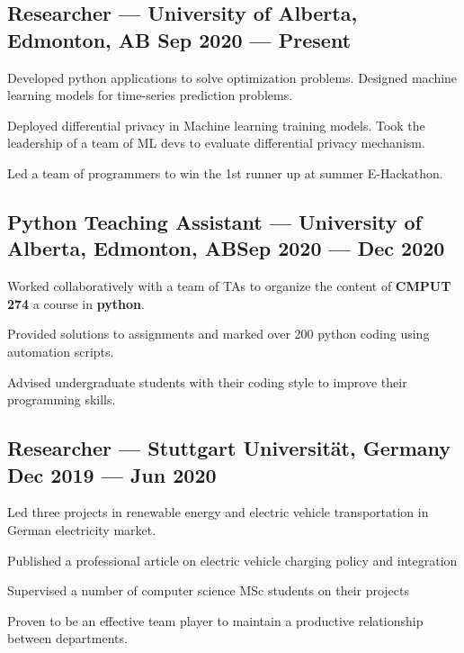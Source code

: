 \documentclass[letter,11pt]{article}
\begin{document}
\subsection{{Researcher --- University of Alberta, Edmonton, AB \hfill Sep 2020 --- Present}}
\begin{zitemize}
	\item Developed python applications to solve optimization problems. Designed machine learning models for time-series prediction problems.
	\item Deployed differential privacy in Machine learning training models. Took the leadership of a team of ML devs to evaluate differential privacy mechanism.
	\item Led a team of programmers to win the 1st runner up at summer E-Hackathon.

\end{zitemize}

\subsection{{Python Teaching Assistant --- University of Alberta, Edmonton, AB\hfill Sep 2020 --- Dec 2020}}
\begin{zitemize}
	\item Worked collaboratively with a team of TAs to organize the content of \textbf{CMPUT 274} a course in \textbf{python}.
	\item Provided solutions to assignments and marked over 200 python coding  using automation scripts.
	\item Advised undergraduate students with their coding style to improve their programming skills.
\end{zitemize}
\subsection{{ Researcher --- Stuttgart Universität, Germany \hfill Dec 2019 --- Jun 2020}}
\begin{zitemize}
	\item Led three projects in renewable energy and electric vehicle transportation in German electricity market.
	\item Published a professional article on electric vehicle charging policy and integration
	\item Supervised a number of computer science MSc students on their projects 
	\item Proven to be an effective team player to maintain a productive relationship between departments.
\end{zitemize}
\end{document}
